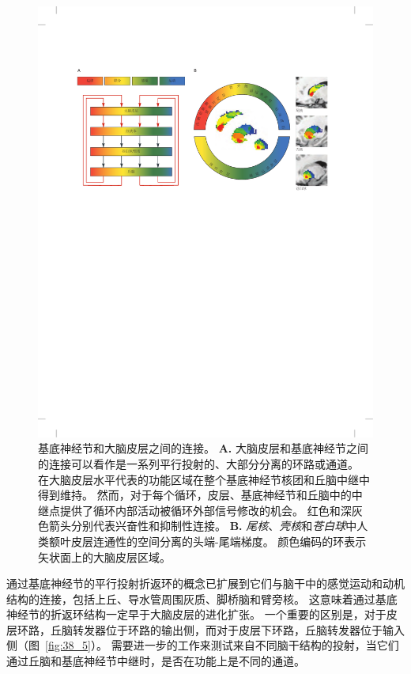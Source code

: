 \begin{figure}[htbp]
	\centering
	\includegraphics[width=1.0\linewidth]{chap38/fig_38_4}
	\caption{基底神经节和大脑皮层之间的连接。
		\textbf{A.} 大脑皮层和基底神经节之间的连接可以看作是一系列平行投射的、大部分分离的环路或通道。
		在大脑皮层水平代表的功能区域在整个基底神经节核团和丘脑中继中得到维持。
		然而，对于每个循环，皮层、基底神经节和丘脑中的中继点提供了循环内部活动被循环外部信号修改的机会。
		红色和深灰色箭头分别代表兴奋性和抑制性连接。
		\textbf{B.} \textit{尾核}、\textit{壳核}和\textit{苍白球}中人类额叶皮层连通性的空间分离的头端-尾端梯度。
		颜色编码的环表示矢状面上的大脑皮层区域\cite{draganski2008evidence}。}
	\label{fig:38_4}
\end{figure}


通过基底神经节的平行投射折返环的概念已扩展到它们与脑干中的感觉运动和动机结构的连接，包括上丘、导水管周围灰质、脚桥脑和臂旁核。
这意味着通过基底神经节的折返环结构一定早于大脑皮层的进化扩张。
一个重要的区别是，对于皮层环路，丘脑转发器位于环路的输出侧，而对于皮层下环路，丘脑转发器位于输入侧（图~\ref{fig:38_5}）。
需要进一步的工作来测试来自不同脑干结构的投射，当它们通过丘脑和基底神经节中继时，是否在功能上是不同的通道。



